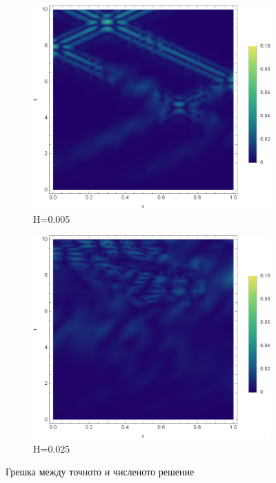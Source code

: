 \documentclass[12pt]{article}
\numberwithin{equation}{section}
\begin{document}
\begin{figure}[h]
    \centering
    \begin{subfigure}[b]{0.47\textwidth}
        \includegraphics[width=\textwidth]{figures/results/error-solution-h-0.005.eps}
        \caption{H=0.005}
    \end{subfigure}
    \hfill
    \begin{subfigure}[b]{0.47\textwidth}
        \includegraphics[width=\textwidth]{figures/results/error-solution-h-0.025.eps}
        \caption{H=0.025}
    \end{subfigure}
    \caption{Грешка между точното и численото решение}
    \label{f:compare-numeric-solution-linear}
\end{figure}
\end{document}

